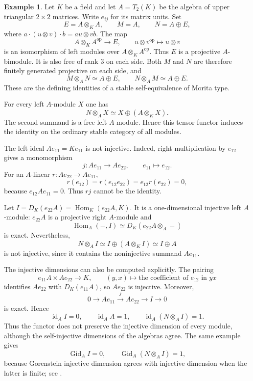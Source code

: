 \documentclass[12pt,a4paper,english,reqno]{amsart}
\numberwithin{equation}{section}
\theoremstyle{plain}
\theoremstyle{definition}
\newtheorem{example}[theorem]{Example}
\begin{document}
\begin{example}
\label{ex:bel-triangular}
Let $K$ be a field and let $A=T_2(K)$ be the algebra of upper triangular
$2\times2$ matrices.  Write $e_{ij}$ for its matrix units.  Set
\[
 E=A\otimes_K A,
 \qquad M=A,
 \qquad N=A\oplus E,
\]
where $a\cdot(u\otimes v)\cdot b=au\otimes vb$.  The map
\[
 A\otimes_K A^{\mathrm{op}}\longrightarrow E,
 \qquad u\otimes v^{\mathrm{op}}\longmapsto u\otimes v
\]
is an isomorphism of left modules over $A\otimes_KA^{\mathrm{op}}$.
Thus $E$ is a projective $A$-bimodule.  It is also free of rank $3$ on
each side.  Both $M$ and $N$ are therefore finitely generated projective
on each side, and
\[
 M\otimes_A N\simeq A\oplus E,
 \qquad N\otimes_A M\simeq A\oplus E.
\]
These are the defining identities of a stable self-equivalence of
Morita type.

For every left $A$-module $X$ one has
\[
 N\otimes_A X\simeq X\oplus(A\otimes_KX).
\]
The second summand is a free left $A$-module.  Hence this tensor functor
induces the identity on the ordinary stable category of all modules.

The left ideal $Ae_{11}=Ke_{11}$ is not injective.  Indeed, right
multiplication by $e_{12}$ gives a monomorphism
\[
 j\colon Ae_{11}\longrightarrow Ae_{22},
 \qquad e_{11}\longmapsto e_{12}.
\]
For an $A$-linear $r\colon Ae_{22}\to Ae_{11}$,
\[
 r(e_{12})=r(e_{12}e_{22})=e_{12}r(e_{22})=0,
\]
because $e_{12}Ae_{11}=0$.  Thus $rj$ cannot be the identity.

Let $I=D_K(e_{22}A)=\operatorname{Hom}_K(e_{22}A,K)$.  It is a
one-dimensional injective left $A$-module: $e_{22}A$ is a projective
right $A$-module and
\[
 \operatorname{Hom}_A(-,I)
 \simeq D_K(e_{22}A\otimes_A-)
\]
is exact.  Nevertheless,
\[
 N\otimes_A I\simeq I\oplus(A\otimes_KI)\simeq I\oplus A
\]
is not injective, since it contains the noninjective summand $Ae_{11}$.

The injective dimensions can also be computed explicitly.  The pairing
\[
 e_{11}A\times Ae_{22}\longrightarrow K,
 \qquad (y,x)\longmapsto
       \text{the coefficient of $e_{12}$ in $yx$}
\]
identifies $Ae_{22}$ with $D_K(e_{11}A)$, so $Ae_{22}$ is injective.
Moreover,
\[
 0\longrightarrow Ae_{11}\xrightarrow{j}Ae_{22}
   \longrightarrow I\longrightarrow0
\]
is exact.  Hence
\[
 \operatorname{id}_A I=0,
 \qquad \operatorname{id}_A A=1,
 \qquad \operatorname{id}_A(N\otimes_A I)=1.
\]
Thus the functor does not preserve the injective dimension of every
module, although the self-injective dimensions of the algebras agree.
The same example gives
\[
 \operatorname{Gid}_A I=0,\qquad
 \operatorname{Gid}_A(N\otimes_AI)=1,
\]
because Gorenstein injective dimension agrees with injective dimension
when the latter is finite; see \cite{Holm2004}.


\end{example}
\end{document}

